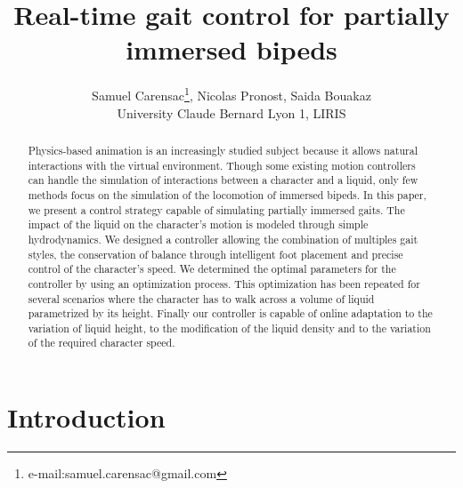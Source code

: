 \documentclass[conference]{acmsiggraph}
\title{Real-time gait control for partially immersed bipeds}
\author{Samuel Carensac\thanks{e-mail:samuel.carensac@gmail.com}, Nicolas Pronost, Saida Bouakaz\\University Claude Bernard Lyon 1, LIRIS}
\begin{document}

\maketitle

\begin{abstract}

Physics-based animation is an increasingly studied subject because it allows natural interactions with the virtual environment. Though some existing motion controllers can handle the simulation of interactions between a character and a liquid, only few methods focus on the simulation of the locomotion of immersed bipeds. In this paper, we present a control strategy capable of simulating partially immersed gaits. The impact of the liquid on the character's motion is modeled through simple hydrodynamics. We designed a controller allowing the combination of multiples gait styles, the conservation of balance through intelligent foot placement and precise control of the character's speed. We determined the optimal parameters for the controller by using an optimization process. This optimization has been repeated for several scenarios where the character has to walk across a volume of liquid parametrized by its height. Finally our controller is capable of online adaptation to the variation of liquid height, to the modification of the liquid density and to the variation of the required character speed.

\end{abstract}

\begin{CRcatlist}
\end{CRcatlist}

\keywordlist

\copyrightspace

\section{Introduction}
\end{document}
